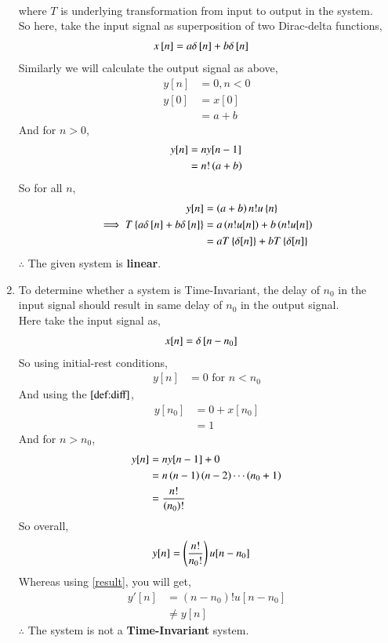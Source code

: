 \documentclass[journal,12pt,twocolumn]{IEEEtran}
\begin{document}
\begin{enumerate}[label = (\alph*)]
\begin{align}
             \end{align}
	     where $T$ is underlying transformation from input to output in the system. \\
	So here, take the input signal as superposition of two Dirac-delta functions,
	 \begin{align}
            x{}\left[n\right] &= a\delta{}\left[n\right] + b\delta{}\left[n\right]
	 \end{align}
	Similarly we will calculate the output signal as above,
	 \begin{align}
	     y[n] &= 0 , n < 0 \\
	     y[0] &= x[0] \\
	          &= a + b 
	 \end{align}
	 And for $n > 0$,
	  \begin{align}
		  y[n] &= ny[n-1] \\
		       &= n!\left(a+b\right)
	  \end{align}
	So for all $n$,
	  \begin{align}
		y[n] &= \left(a+b\right)n!u\left\{n\right\} \\
		\implies T\left\{a\delta{}\left[n\right] + b\delta{}\left[n\right]\right\} &= a\left(n!u[n]\right) + b\left(n!u[n]\right) \\
								      &= aT\left\{\delta[n]\right\} + bT\left\{\delta[n]\right\} 
          \end{align}
	  $\therefore$ The given system is \textbf{linear}.
  \item To determine whether a system is Time-Invariant, the delay of $n_{0}$ in the input signal should result in same delay of $n_{0}$ in the output signal.\\
	Here take the input signal as,
	 \begin{align}
	    x[n] &= \delta{}\left[n-n_{0}\right] 
	 \end{align}
     So using initial-rest conditions,
       \begin{align}
	       y[n] &= 0 \, \,\text{for} \, \, n < n_{0}
       \end{align}
  And using the $\eqref{def:diff}$,
      \begin{align}
	  y[n_{0}] &= 0 + x[n_0] \\
	           &= 1
      \end{align}
  And for $n > n_0$,
  \begin{align}
	  y[n] &= ny[n-1] + 0 \\
	       &= n\left(n-1\right)\left(n-2\right)\cdots \left(n_0+1\right) \\
	       &= \frac{n!}{\left(n_0\right)!}
  \end{align}
 So overall,
       \begin{align}
	       y[n] &= \left(\frac{n!}{n_0!}\right)u[n-n_0]
       \end{align}
       Whereas using \eqref{result}, you will get,
        \begin{align}
		y'[n] &= (n-n_0)!u[n-n_0] \\
		      &\neq y[n]
	\end{align}
 $\therefore$ The system is not a \textbf{Time-Invariant} system.
\end{enumerate}
\end{document}
